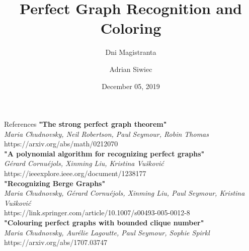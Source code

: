 \documentclass{beamer}
\title{Perfect Graph Recognition and Coloring}
\subtitle{Dni Magistranta}
\author{Adrian Siwiec}
\date{December 05, 2019}
\begin{document}
\begin{frame}
\titlepage
\end{frame}

\begin{frame}{References}
	\textbf{"The strong perfect graph theorem"}
	\\ \emph{Maria Chudnovsky, Neil Robertson, Paul Seymour, Robin Thomas}
	\\ https://arxiv.org/abs/math/0212070
	\vspace{0.3cm}\\
	\textbf{"A polynomial algorithm for recognizing perfect graphs"}
	\\ \emph{Gérard Cornuéjols, Xinming Liu, Kristina Vušković}
	\\ https://ieeexplore.ieee.org/document/1238177
	\vspace{0.3cm}\\
	\textbf{"Recognizing Berge Graphs"}
	\\ \emph{Maria Chudnovsky, Gérard Cornuéjols, Xinming Liu, Paul Seymour, Kristina Vušković}
	\\ https://link.springer.com/article/10.1007/s00493-005-0012-8
	\vspace{0.3cm}\\
	\textbf{"Colouring perfect graphs with bounded clique number"}
	\\ \emph{Maria Chudnovsky, Aurélie Lagoutte, Paul Seymour, Sophie Spirkl}
	\\ https://arxiv.org/abs/1707.03747
	
\end{frame}
\end{document}
